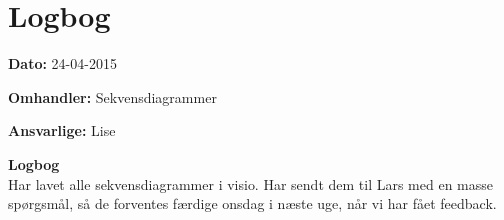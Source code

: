 \chapter{Logbog}

\textbf{Dato:} 24-04-2015

\textbf{Omhandler:} Sekvensdiagrammer

\textbf{Ansvarlige:} Lise

\textbf{Logbog}
\\

Har lavet alle sekvensdiagrammer i visio. Har sendt dem til Lars med en masse spørgsmål, så de forventes færdige onsdag i næste uge, når vi har fået feedback. 